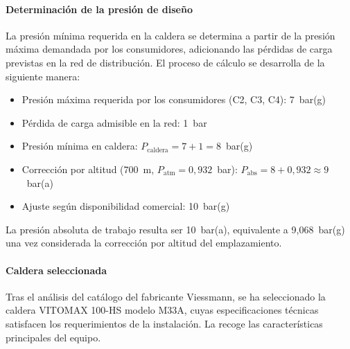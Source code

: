 \documentclass[12pt]{article}
\begin{document}
\paragraph{Determinación de la presión de diseño}

La presión mínima requerida en la caldera se determina a partir de la presión máxima demandada por los consumidores, adicionando las pérdidas de carga previstas en la red de distribución. El proceso de cálculo se desarrolla de la siguiente manera:

\begin{itemize}[leftmargin=2em]
	\item Presión máxima requerida por los consumidores (C2, C3, C4): 7~bar(g)
	\item Pérdida de carga admisible en la red: 1~bar
	\item Presión mínima en caldera: $P_{\text{caldera}} = 7 + 1 = 8$~bar(g)
	\item Corrección por altitud (700~m, $P_{\text{atm}} = 0{,}932$~bar): $P_{\text{abs}} = 8 + 0{,}932 \approx 9$~bar(a)
	\item Ajuste según disponibilidad comercial: 10~bar(g)
\end{itemize}

La presión absoluta de trabajo resulta ser 10~bar(a), equivalente a 9,068~bar(g) una vez considerada la corrección por altitud del emplazamiento.

\paragraph{Caldera seleccionada}

Tras el análisis del catálogo del fabricante Viessmann, se ha seleccionado la caldera VITOMAX 100-HS modelo M33A, cuyas especificaciones técnicas satisfacen los requerimientos de la instalación. La  recoge las características principales del equipo.
\end{document}
